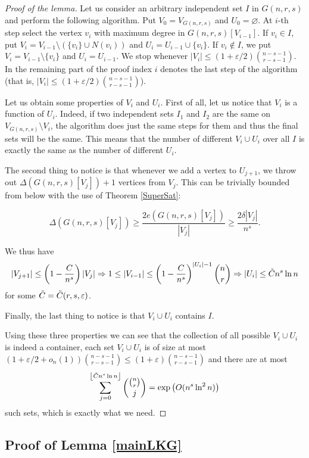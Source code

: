 \documentclass[12pt]{article}
\theoremstyle{remark}
\theoremstyle{definition}
\newcommand{\skob}[1]{\left(#1\right)}
\newcommand{\flr}[1]{\left\lfloor#1\right\rfloor}
\begin{document}
\begin{proof}[Proof of the lemma]
    Let us consider an arbitrary independent set $I$ in $G(n,r,s)$ and perform the following algorithm. Put $V_0 = V_{G(n,r,s)}$ and $U_0 = \varnothing$. At $i$-th step select the vertex $v_i$ with maximum degree in $G(n,r,s)[V_{i-1}]$. If $v_i \in I$, put $V_i = V_{i-1} \setminus (\{v_i\} \cup N(v_i))$ and $U_i = U_{i-1} \cup \{v_i\}$. If $v_i \notin I$, we put $V_i = V_{i-1} \setminus \{v_i\}$ and $U_i = U_{i-1}$. We stop whenever $|V_i| \leq (1+\varepsilon/2)\binom{n-s-1}{r-s-1}$. In the remaining part of the proof index $i$ denotes the last step of the algorithm (that is, $|V_i| \leq (1+\varepsilon/2)\binom{n-s-1}{r-s-1}$).

    Let us obtain some properties of $V_i$ and $U_i$. First of all, let us notice that $V_i$ is a function of $U_i$. Indeed, if two independent sets $I_1$ and $I_2$ are the same on $V_{G(n,r,s)} \setminus V_i$, the algorithm does just the same steps for them and thus the final sets will be the same. This means that the number of different $V_i \cup U_i$ over all $I$ is exactly the same as the number of different $U_i$. 

    The second thing to notice is that whenever we add a vertex to $U_{j+1}$, we throw out $\Delta(G(n,r,s)[V_j])+1$ vertices from $V_j$. This can be trivially bounded from below with the use of Theorem \ref{SuperSat}: 

    $$
        \Delta(G(n,r,s)[V_j]) \geq \frac{2e(G(n,r,s)[V_j])}{|V_j|} \geq \frac{2\delta|V_j|}{n^s}.
    $$

    We thus have 
    $$
    |V_{j+1}| \leq \skob{1-\frac{C}{n^s}}|V_j| \Rightarrow 1 \leq |V_{i-1}| \leq \skob{1-\frac{C}{n^s}}^{|U_i|-1}\binom{n}{r} \Rightarrow |U_i| \leq \Tilde{C}n^s\ln n
    $$
    for some $\Tilde{C} = \Tilde{C}(r,s,\varepsilon)$.

    Finally, the last thing to notice is that $V_i \cup U_i$ contains $I$.

    Using these three properties we can see that the collection of all possible $V_i \cup U_i$ is indeed a container, each set $V_i \cup U_i$ is of size at most $(1 + \varepsilon/2 + o_n(1))\binom{n-s-1}{r-s-1} \leq (1 + \varepsilon)\binom{n-s-1}{r-s-1}$ and there are at most 
    $$
        \sum_{j = 0}^{\flr{\Tilde{C}n^s\ln n}} \binom{\binom{n}{r}}{j} = \exp\skob{O(n^s\ln^2 n)}
    $$
    such sets, which is exactly what we need.
\end{proof}

\subsection{Proof of Lemma \ref{mainLKG}}
\end{document}
